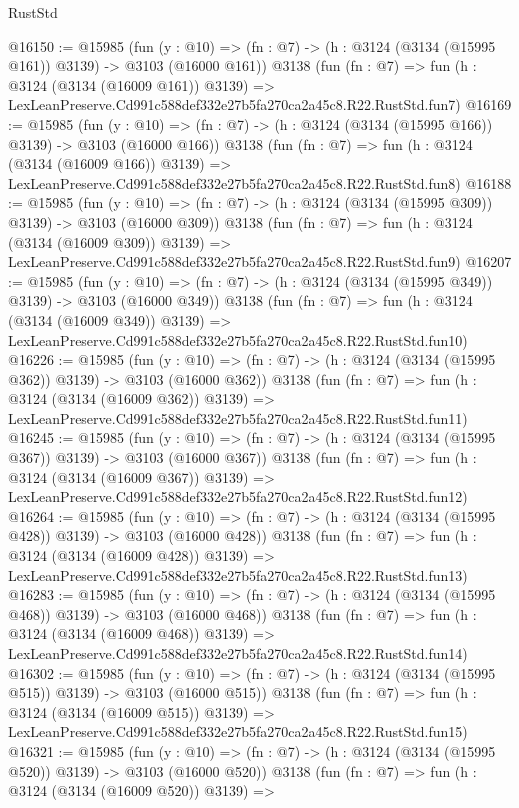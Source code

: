 \begin{lexlean}{RustStd}
\begin{coremodule}
@16150 := @15985
    (fun (y : @10) => (fn : @7) -> (h : @3124 (@3134 (@15995 @161)) @3139) -> @3103 (@16000 @161))
    @3138
    (fun (fn : @7) =>
    fun (h : @3124 (@3134 (@16009 @161)) @3139) =>
    LexLeanPreserve.Cd991c588def332e27b5fa270ca2a45c8.R22.RustStd.fun7)
@16169 := @15985
    (fun (y : @10) => (fn : @7) -> (h : @3124 (@3134 (@15995 @166)) @3139) -> @3103 (@16000 @166))
    @3138
    (fun (fn : @7) =>
    fun (h : @3124 (@3134 (@16009 @166)) @3139) =>
    LexLeanPreserve.Cd991c588def332e27b5fa270ca2a45c8.R22.RustStd.fun8)
@16188 := @15985
    (fun (y : @10) => (fn : @7) -> (h : @3124 (@3134 (@15995 @309)) @3139) -> @3103 (@16000 @309))
    @3138
    (fun (fn : @7) =>
    fun (h : @3124 (@3134 (@16009 @309)) @3139) =>
    LexLeanPreserve.Cd991c588def332e27b5fa270ca2a45c8.R22.RustStd.fun9)
@16207 := @15985
    (fun (y : @10) => (fn : @7) -> (h : @3124 (@3134 (@15995 @349)) @3139) -> @3103 (@16000 @349))
    @3138
    (fun (fn : @7) =>
    fun (h : @3124 (@3134 (@16009 @349)) @3139) =>
    LexLeanPreserve.Cd991c588def332e27b5fa270ca2a45c8.R22.RustStd.fun10)
@16226 := @15985
    (fun (y : @10) => (fn : @7) -> (h : @3124 (@3134 (@15995 @362)) @3139) -> @3103 (@16000 @362))
    @3138
    (fun (fn : @7) =>
    fun (h : @3124 (@3134 (@16009 @362)) @3139) =>
    LexLeanPreserve.Cd991c588def332e27b5fa270ca2a45c8.R22.RustStd.fun11)
@16245 := @15985
    (fun (y : @10) => (fn : @7) -> (h : @3124 (@3134 (@15995 @367)) @3139) -> @3103 (@16000 @367))
    @3138
    (fun (fn : @7) =>
    fun (h : @3124 (@3134 (@16009 @367)) @3139) =>
    LexLeanPreserve.Cd991c588def332e27b5fa270ca2a45c8.R22.RustStd.fun12)
@16264 := @15985
    (fun (y : @10) => (fn : @7) -> (h : @3124 (@3134 (@15995 @428)) @3139) -> @3103 (@16000 @428))
    @3138
    (fun (fn : @7) =>
    fun (h : @3124 (@3134 (@16009 @428)) @3139) =>
    LexLeanPreserve.Cd991c588def332e27b5fa270ca2a45c8.R22.RustStd.fun13)
@16283 := @15985
    (fun (y : @10) => (fn : @7) -> (h : @3124 (@3134 (@15995 @468)) @3139) -> @3103 (@16000 @468))
    @3138
    (fun (fn : @7) =>
    fun (h : @3124 (@3134 (@16009 @468)) @3139) =>
    LexLeanPreserve.Cd991c588def332e27b5fa270ca2a45c8.R22.RustStd.fun14)
@16302 := @15985
    (fun (y : @10) => (fn : @7) -> (h : @3124 (@3134 (@15995 @515)) @3139) -> @3103 (@16000 @515))
    @3138
    (fun (fn : @7) =>
    fun (h : @3124 (@3134 (@16009 @515)) @3139) =>
    LexLeanPreserve.Cd991c588def332e27b5fa270ca2a45c8.R22.RustStd.fun15)
@16321 := @15985
    (fun (y : @10) => (fn : @7) -> (h : @3124 (@3134 (@15995 @520)) @3139) -> @3103 (@16000 @520))
    @3138
    (fun (fn : @7) =>
    fun (h : @3124 (@3134 (@16009 @520)) @3139) =>

\end{coremodule}
\end{lexlean}
